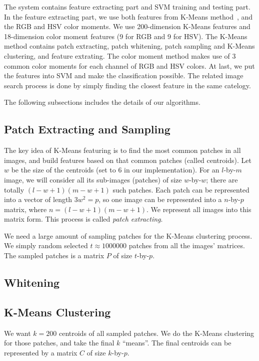 \documentclass{acm_proc_article-sp}
\begin{document}
The system contains feature extracting part and SVM training and testing part.
In the feature extracting part,
    we use both features from K-Means method~\cite{coates2011analysis},
    and the RGB and HSV color moments.
We use 200-dimension K-Means features and 18-dimension color moment
features (9 for RGB and 9 for HSV).
The K-Means method contains patch extracting, patch whitening,
    patch sampling and K-Means clustering,
    and feature extrating.
The color moment method makes use of 3 common color moments for 
    each channel of RGB and HSV colors.
At last, we put the features into SVM and make the classification possible.
The related image search process is done by simply finding
    the closest feature in the same catelogy.

The following subsections includes the details of our algorithms.

\subsection{Patch Extracting and Sampling}

The key idea of K-Means featuring is to find the most common
    patches in all images, and build features based on that
    common patches (called centroids).
Let $w$ be the size of the centroids (set to $6$ in our implementation).
For an $l$-by-$m$ image,
we will consider all its sub-images (patches) of size $w$-by-$w$;
there are totally $(l-w+1)(m-w+1)$ such patches.
Each patch can be represented into a vector of length $3w^2 = p$,
    so one image can be represented into a $n$-by-$p$ matrix,
    where $n=(l-w+1)(m-w+1)$.
We represent all images into this matrix form.
This process is called \emph{patch extracting}.

We need a large amount of sampling patches for the K-Means clustering process.
We simply random selected $t\approx 1000000$ patches
    from all the images' matrices.
The sampled patches is a matrix $P$ of size $t$-by-$p$.

\subsection{Whitening}


\subsection{K-Means Clustering}

We want $k=200$ centroids of all sampled patches.
We do the K-Means clustering for those patches,
    and take the final $k$ ``means''.
The final centroids can be represented by a matrix $C$ of size $k$-by-$p$.
\end{document}
